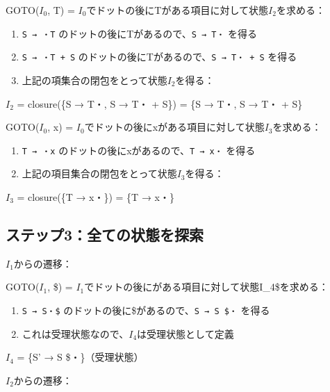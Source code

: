 GOTO(\(I_0\), T) =
\(I_0\)でドットの後にTがある項目に対して状態\(I_2\)を求める：

\begin{enumerate}
\def\labelenumi{\arabic{enumi}.}
\tightlist
\item
  \texttt{S\ →\ ・T} のドットの後にTがあるので、\texttt{S\ →\ T・}
  を得る
\item
  \texttt{S\ →\ ・T\ +\ S}
  のドットの後にTがあるので、\texttt{S\ →\ T・\ +\ S} を得る
\item
  上記の項集合の閉包をとって状態\(I_2\)を得る：
\end{enumerate}

\(I_2\) = closure(\{S → T・, S → T・ + S\}) = \{S → T・, S → T・ + S\}

GOTO(\(I_0\), x) =
\(I_0\)でドットの後にxがある項目に対して状態\(I_3\)を求める：

\begin{enumerate}
\def\labelenumi{\arabic{enumi}.}
\tightlist
\item
  \texttt{T\ →\ ・x} のドットの後にxがあるので、\texttt{T\ →\ x・}
  を得る
\item
  上記の項目集合の閉包をとって状態\(I_3\)を得る：
\end{enumerate}

\(I_3\) = closure(\{T → x・\}) = \{T → x・\}

\hypertarget{chapter5-ux30b9ux30c6ux30c3ux30d73ux5168ux3066ux306eux72b6ux614bux3092ux63a2ux7d22}{%
\subsection{ステップ3：全ての状態を探索}\label{chapter5-ux30b9ux30c6ux30c3ux30d73ux5168ux3066ux306eux72b6ux614bux3092ux63a2ux7d22}}

\(I_1\)からの遷移：

GOTO(\(I_1\), \$) =
\(I_1\)でドットの後に\(がある項目に対して状態\)I\_4\$を求める：

\begin{enumerate}
\def\labelenumi{\arabic{enumi}.}
\tightlist
\item
  \texttt{S\textquotesingle{}\ →\ S・\$}
  のドットの後に\$があるので、\texttt{S\textquotesingle{}\ →\ S\ \$・}
  を得る
\item
  これは受理状態なので、\(I_4\)は受理状態として定義
\end{enumerate}

\(I_4\) = \{S' → S \$・\}（受理状態）

\(I_2\)からの遷移：

